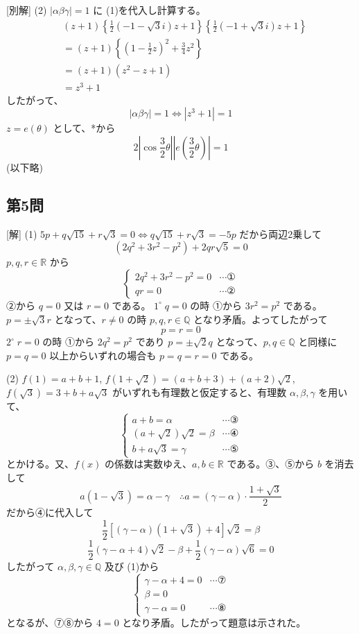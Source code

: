 \documentclass[../main.tex]{subfiles}
\begin{document}
[別解]
(2) $|\alpha \beta \gamma| = 1$ に (1)を代入し計算する。
\begin{align*}
  & (z+1)\left\{ \frac{1}{2}(-1 - \sqrt{3}i)z + 1 \right\} \left\{ \frac{1}{2}(-1 + \sqrt{3}i)z + 1 \right\} \\
  &= (z+1)\left\{ (1 - \frac{1}{2}z)^2 + \frac{3}{4}z^2 \right\} \\
  &= (z+1)(z^2 - z + 1) \\
  &= z^3 + 1
\end{align*}
したがって、
$$ |\alpha \beta \gamma| = 1 \iff |z^3 + 1| = 1 $$
$z = e(\theta)$ として、*から
$$ 2 \left| \cos \frac{3}{2}\theta \right| \left| e\left(\frac{3}{2}\theta\right) \right| = 1 $$
(以下略)

\subsection*{第5問}
[解]
(1) $5p + q\sqrt{15} + r\sqrt{3} = 0 \iff q\sqrt{15} + r\sqrt{3} = -5p$ だから両辺2乗して
$$ (2q^2 + 3r^2 - p^2) + 2qr\sqrt{5} = 0 $$
$p, q, r \in \mathbb{R}$ から
$$
\begin{cases} 2q^2 + 3r^2 - p^2 = 0 & \cdots \text{①} \\ qr = 0 & \cdots \text{②}
\end{cases} $$
②から $q=0$ 又は $r=0$ である。
$1^\circ \; q=0$ の時
①から $3r^2 = p^2$ である。$p = \pm \sqrt{3} r$ となって、$r \ne 0$ の時 $p, q, r \in \mathbb{Q}$ となり矛盾。よってしたがって
$$ p = r = 0 $$
$2^\circ \; r=0$ の時
①から $2q^2 = p^2$ であり $p = \pm \sqrt{2} q$ となって、$p, q \in \mathbb{Q}$ と同様に $p = q = 0$
以上からいずれの場合も $p = q = r = 0$ である。

(2) $f(1) = a+b+1$, $f(1+\sqrt{2}) = (a+b+3) + (a+2)\sqrt{2}$, $f(\sqrt{3}) = 3+b + a\sqrt{3}$ がいずれも有理数と仮定すると、有理数 $\alpha, \beta, \gamma$ を用いて、
$$
\begin{cases} a+b = \alpha & \cdots \text{③} \\ (a+\sqrt{2})\sqrt{2} = \beta & \cdots \text{④} \\ b+a\sqrt{3} = \gamma & \cdots \text{⑤}
\end{cases} $$
とかける。又、$f(x)$ の係数は実数ゆえ、$a, b \in \mathbb{R}$ である。③、⑤から $b$ を消去して
$$ a(1 - \sqrt{3}) = \alpha - \gamma \quad \therefore a = (\gamma - \alpha) \cdot \frac{1+\sqrt{3}}{2} $$
だから④に代入して
$$ \frac{1}{2} \left[ (\gamma - \alpha)(1 + \sqrt{3}) + 4 \right] \sqrt{2} = \beta $$
$$ \frac{1}{2}(\gamma - \alpha + 4)\sqrt{2} - \beta + \frac{1}{2}(\gamma - \alpha)\sqrt{6} = 0 $$
したがって $\alpha, \beta, \gamma \in \mathbb{Q}$ 及び (1)から
$$
\begin{cases} \gamma - \alpha + 4 = 0 & \cdots \text{⑦} \\ \beta = 0 \\ \gamma - \alpha = 0 & \cdots \text{⑧}
\end{cases} $$
となるが、⑦⑧から $4=0$ となり矛盾。したがって題意は示された。
\end{document}

